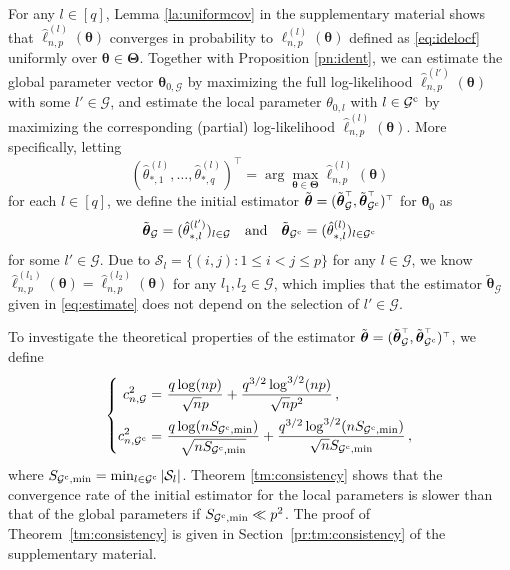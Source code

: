 \documentclass[12pt]{article}
\newcommand{\bTheta}{\boldsymbol \Theta}
\newcommand{\btheta}{\boldsymbol \theta}
\def\T{{\scriptscriptstyle \top} }
\newcommand{\btc}{{\rm c}}
\newcommand{\0}{{\bf 0}}
\begin{document}
For any $l\in[q]$, Lemma \ref{la:uniformcov} in the supplementary material shows that $\hat{\ell}_{n,p}^{(l)}(\btheta)$ converges in probability to $\ell_{n,p}^{(l)}(\btheta)$ defined as \eqref{eq:idelocf} uniformly over $\btheta\in\bTheta$. 
Together with Proposition \ref{pn:ident}, we can estimate the global parameter vector $\btheta_{0,\mathcal{G}}$ by maximizing the full log-likelihood $\hat{\ell}_{n,p}^{(l')}(\btheta)$ with some $l'\in\mathcal{G}$, and estimate the local parameter $\theta_{0,l}$ with $l\in\mathcal{G}^{\btc}$ by maximizing the corresponding (partial) log-likelihood $\hat{\ell}_{n,p}^{(l)}(\btheta)$. More specifically, letting $$(\hat \theta_{*,1}^{(l)}, \dots,\hat \theta_{*,q}^{(l)} )^{\T} =\arg\max_{\btheta\in\bTheta}\hat{\ell}_{n,p}^{(l)}(\btheta)$$ for each $l\in[q]$, we define the initial estimator $\tilde{\btheta}=(\tilde{\btheta}_{\mathcal{G}}^{\T},\tilde{\btheta}_{\mathcal{G}^{\btc}}^{\T})^{\T}$ for $\btheta_0$ as
\begin{align}\label{eq:estimate}
\tilde{\btheta}_{\mathcal{G}}=(\hat{\theta}_{*,l}^{(l')})_{l\in\mathcal{G}}~~~\textrm{and}~~~\tilde{\btheta}_{\mathcal{G}^{\btc}}=(\hat{\theta}_{*,l}^{(l)})_{l\in\mathcal{G}^{\btc}}
\end{align}
for some $l'\in\mathcal{G}$. Due to $\mathcal{S}_l=\{(i,j):1\le i < j \le p\}$
for any $l\in\mathcal{G}$, we know $\hat{\ell}_{n,p}^{(l_1)}(\btheta)=\hat{\ell}_{n,p}^{(l_2)}(\btheta)$ for any $l_1,l_2\in\mathcal{G}$, which implies that the estimator $\tilde{\btheta}_{\mathcal{G}}$ given in \eqref{eq:estimate} does not depend on the selection of $l'\in\mathcal{G}$. 




To investigate the theoretical properties of the  estimator $\tilde{\btheta}=(\tilde{\btheta}_{\mathcal{G}}^{\T},\tilde{\btheta}_{\mathcal{G}^{\btc}}^{\T})^{\T}$, we define \begin{align}\label{eq:cnggc}
\left\{\begin{aligned}
   c_{n,\mathcal{G}}^2=&~\frac{q\log(np)}{\sqrt{n}p}+\frac{q^{3/2}\log^{3/2}(np)}{\sqrt{n}p^2}\,, \\
   c_{n,\mathcal{G}^{\btc}}^2=&~\frac{q\log(nS_{\mathcal{G}^{\btc},\min})}{\sqrt{nS_{\mathcal{G}^{\btc},\min}}}+\frac{q^{3/2}\log^{3/2}(nS_{\mathcal{G}^{\btc},\min})}{\sqrt{n}S_{\mathcal{G}^{\btc},\min}}\,,
\end{aligned}\right.
\end{align}
where $S_{\mathcal{G}^{\btc},\min}=\min_{l\in\mathcal{G}^{\btc}}|\mathcal{S}_l|$. 
Theorem \ref{tm:consistency} shows that the convergence rate of the
initial estimator for
the local parameters is slower than that of the global parameters if
$S_{\mathcal{G}^{\btc},\min} \ll p^2$. The proof of Theorem~\ref{tm:consistency} is given in Section~\ref{pr:tm:consistency} of the supplementary material.
\end{document}
